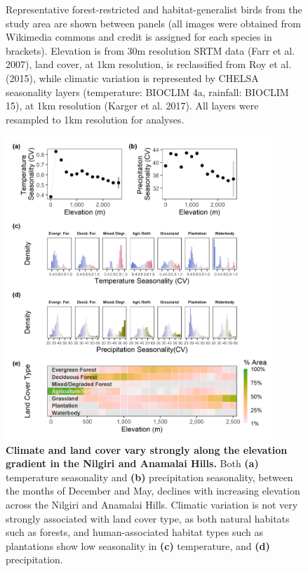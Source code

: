 \begin{figure}[h!]
{        Representative forest-restricted and habitat-generalist birds from the study area are shown between panels (all images were obtained from Wikimedia commons and credit is assigned for each species in brackets). 
        Elevation is from 30m resolution SRTM data (Farr et al. 2007), land cover, at 1km resolution, is reclassified from Roy et al. (2015), while climatic variation is represented by CHELSA seasonality layers (temperature: BIOCLIM 4a, rainfall: BIOCLIM 15), at 1km resolution (Karger et al. 2017). All layers were resampled to 1km resolution for analyses.
    }
    \label{hilly_fig_01}
\end{figure}

\begin{figure}[h!]
    \centering
    \includegraphics[width=0.9\textwidth]{figures/hillybirds/fig_02.png}
    \caption{
        \textbf{Climate and land cover vary strongly along the elevation gradient in the Nilgiri and Anamalai Hills.}
        Both \textbf{(a)} temperature seasonality and \textbf{(b)} precipitation seasonality, between the months of December and May, declines with increasing elevation across the Nilgiri and Anamalai Hills. 
        Climatic variation is not very strongly associated with land cover type, as both natural habitats such as forests, and human-associated habitat types such as plantations show low seasonality in \textbf{(c)} temperature, and \textbf{(d)} precipitation.
}
\end{figure}
